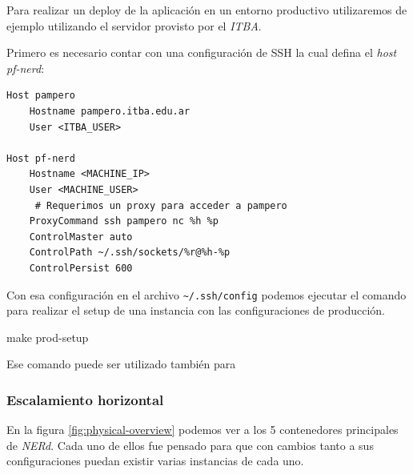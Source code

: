 \documentclass[12pt,a4paper,]{scrartcl}
\newenvironment{Shaded}{\begin{snugshade}}{\end{snugshade}}
\newcommand{\FunctionTok}[1]{\textcolor[rgb]{0.00,0.00,0.00}{#1}}
\newcommand{\NormalTok}[1]{#1}
\begin{document}
Para realizar un deploy de la aplicación en un entorno productivo utilizaremos de ejemplo utilizando el servidor provisto por el \emph{ITBA}.

Primero es necesario contar con una configuración de SSH la cual defina el \emph{host} \emph{pf-nerd}:

\begin{verbatim}
Host pampero
    Hostname pampero.itba.edu.ar
    User <ITBA_USER>

Host pf-nerd
    Hostname <MACHINE_IP>
    User <MACHINE_USER>
     # Requerimos un proxy para acceder a pampero
    ProxyCommand ssh pampero nc %h %p
    ControlMaster auto
    ControlPath ~/.ssh/sockets/%r@%h-%p
    ControlPersist 600
\end{verbatim}

Con esa configuración en el archivo \texttt{\textasciitilde{}/.ssh/config} podemos ejecutar el comando para realizar el setup de una instancia con las configuraciones de producción.

\begin{Shaded}
\begin{Highlighting}[]
\FunctionTok{make}\NormalTok{ prod-setup}
\end{Highlighting}
\end{Shaded}

Ese comando puede ser utilizado también para

\hypertarget{escalamiento-horizontal}{%
\subsubsection{Escalamiento horizontal}\label{escalamiento-horizontal}}

En la figura \ref{fig:physical-overview} podemos ver a los 5 contenedores principales de \emph{NERd}. Cada uno de ellos fue pensado para que con cambios tanto a sus configuraciones puedan existir varias instancias de cada uno.
\end{document}

